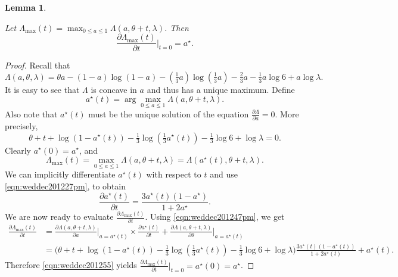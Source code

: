 \documentclass[bj,authoryear,noshowframe]{imsart}
\numberwithin{equation}{section}
\theoremstyle{plain}
\newtheorem{lem}[thm]{Lemma}
\theoremstyle{definition}
\begin{document}
\begin{lem}
\label{techlemma:weddec20200pm}

Let $\Lambda_{\max}(t)=\max_{0\leq a\leq 1}\Lambda(a,\theta+t,\lambda)$. Then
$$
\frac{\partial\Lambda_{\max}(t)}{\partial t}  \big |_{t=0} = a^{\star}.
$$
\end{lem}
\begin{proof}
Recall that 
$$
\Lambda(a,\theta,\lambda) = \theta a - (1-a) \log(1-a) - (\tfrac13 a) \log(\tfrac13 a)-\tfrac23 a -\tfrac13 a \log{6} + a\log{\lambda}.
$$
It is easy to see that $\Lambda$ is concave in $a$ and thus has a unique maximum. Define 
$$
a^\star(t) = \arg\max_{0\leq a \leq 1} \Lambda(a,\theta+t,\lambda).
$$ 
Also note that $a^\star(t)$ must be the unique solution of the equation $\frac{\partial \Lambda}{\partial a}=0$. More precisely,
\begin{equation}
\label{eqn:weddec201227pm}
\theta+t+\log(1-a^\star(t))-\tfrac{1}{3}\log(\tfrac{1}{3}a^\star(t))-\tfrac13 \log{6} + \log{\lambda}=0.
\end{equation}
Clearly $a^\star(0)=a^\star$, and 
\begin{equation}
\label{eqn:weddec201247pm}
\Lambda_{\max}(t)=\max_{0\leq a\leq 1}\Lambda(a,\theta+t,\lambda)= \Lambda(a^\star(t),\theta+t,\lambda).
\end{equation}
We can implicitly differentiate $a^{\star}(t)$ with respect to $t$ and use \eqref{eqn:weddec201227pm}, to obtain
\begin{equation}
\frac{\partial a^{\star}(t)}{\partial t} = \frac{3a^{\star}(t)(1-a^{\star})}{1+2a^{\star}}.
\end{equation}
We are now ready to evaluate $\frac{\partial\Lambda_{\max}(t)}{\partial t}$. Using \eqref{eqn:weddec201247pm}, we get 
\begin{equation}
\label{eqn:weddec201255}
\begin{aligned}
\frac{\partial\Lambda_{\max}(t)}{\partial t} 
&= \frac{\partial\Lambda(a,\theta+t,\lambda)}{\partial a}\Big|_{a=a^\star(t)} 
\times \frac{\partial a^{\star}(t)}{\partial t} +\frac{\partial\Lambda(a,\theta+t,\lambda)}{\partial \theta}\Big|_{a=a^\star(t)}\\
&= \Big(\theta+t +\log(1-a^\star(t))-\tfrac{1}{3}\log(\tfrac{1}{3}a^\star(t))-\tfrac13 \log{6} + \log{\lambda}\Big)
\frac{3a^{\star}(t)(1-a^{\star}(t))}{1+2a^{\star}(t)}+a^{\star}(t).
\end{aligned}
\end{equation}
Therefore \eqref{eqn:weddec201255} yields $\frac{\partial\Lambda_{\max}(t)}{\partial t}  \big |_{t=0} = a^{\star}(0)=a^{\star}$.
\end{proof}
\end{document}

